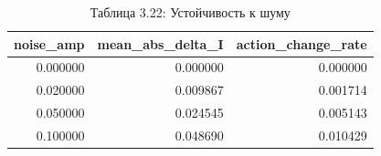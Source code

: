 \begin{table}[htbp]
\caption{Таблица 3.22: Устойчивость к шуму}
\label{tab:3_22}
\begin{tabular}{rrr}
\toprule
noise\_amp & mean\_abs\_delta\_I & action\_change\_rate \\
\midrule
0.000000 & 0.000000 & 0.000000 \\
0.020000 & 0.009867 & 0.001714 \\
0.050000 & 0.024545 & 0.005143 \\
0.100000 & 0.048690 & 0.010429 \\
\bottomrule
\end{tabular}
\end{table}
